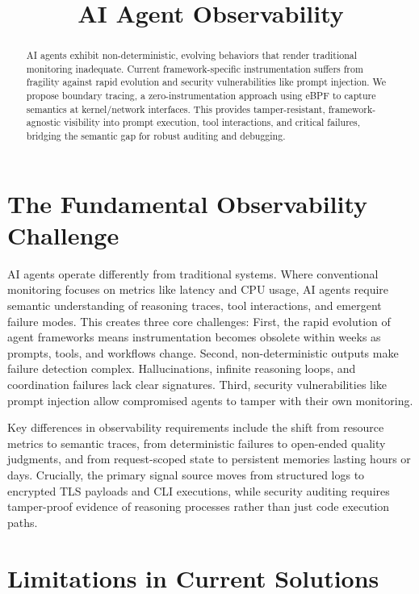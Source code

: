 \documentclass[sigplan,screen，review,9pt]{acmart}
\begin{document}
\title{AI Agent Observability}


\author{}


\sloppy
\begin{abstract}
AI agents exhibit non-deterministic, evolving behaviors that render traditional monitoring inadequate. Current framework-specific instrumentation suffers from fragility against rapid evolution and security vulnerabilities like prompt injection. We propose boundary tracing, a zero-instrumentation approach using eBPF to capture semantics at kernel/network interfaces. This provides tamper-resistant, framework-agnostic visibility into prompt execution, tool interactions, and critical failures, bridging the semantic gap for robust auditing and debugging.
\end{abstract}


\maketitle



\section{The Fundamental Observability Challenge}

AI agents operate differently from traditional systems. Where conventional monitoring focuses on metrics like latency and CPU usage, AI agents require semantic understanding of reasoning traces, tool interactions, and emergent failure modes. This creates three core challenges: First, the rapid evolution of agent frameworks means instrumentation becomes obsolete within weeks as prompts, tools, and workflows change. Second, non-deterministic outputs make failure detection complex. Hallucinations, infinite reasoning loops, and coordination failures lack clear signatures. Third, security vulnerabilities like prompt injection allow compromised agents to tamper with their own monitoring.

Key differences in observability requirements include the shift from resource metrics to semantic traces, from deterministic failures to open-ended quality judgments, and from request-scoped state to persistent memories lasting hours or days. Crucially, the primary signal source moves from structured logs to encrypted TLS payloads and CLI executions, while security auditing requires tamper-proof evidence of reasoning processes rather than just code execution paths.


\section{Limitations in Current Solutions}
\end{document}
